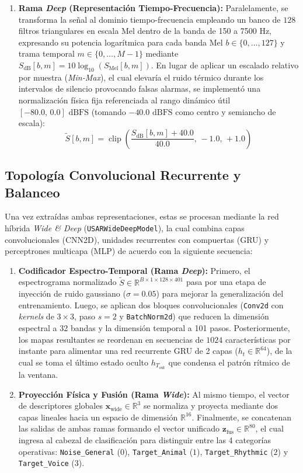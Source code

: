 \documentclass[journal, a4paper]{IEEEtran}
\begin{document}
\begin{enumerate}
    \item[2)] \textbf{Rama \textit{Deep} (Representación Tiempo-Frecuencia):} Paralelamente, se transforma la señal al dominio tiempo-frecuencia empleando un banco de $128$ filtros triangulares en escala Mel dentro de la banda de 150 a 7500 Hz, expresando su potencia logarítmica para cada banda Mel $b \in \{0, \dots, 127\}$ y trama temporal $m \in \{0, \dots, M-1\}$ mediante $S_{\text{dB}}[b, m] = 10\log_{10}(S_{\text{Mel}}[b, m])$. En lugar de aplicar un escalado relativo por muestra (\textit{Min-Max}), el cual elevaría el ruido térmico durante los intervalos de silencio provocando falsas alarmas, se implementó una normalización física fija referenciada al rango dinámico útil $[-80.0, \, 0.0]\text{ dBFS}$ (tomando $-40.0\text{ dBFS}$ como centro y semiancho de escala):
    \begin{equation}
        \tilde{S}[b, m] = \operatorname{clip}\left( \frac{S_{\text{dB}}[b, m] + 40.0}{40.0}, \, -1.0, \, +1.0 \right)
    \end{equation}
\end{enumerate}

\subsection{Topología Convolucional Recurrente y Balanceo}
Una vez extraídas ambas representaciones, estas se procesan mediante la red híbrida \textit{Wide \& Deep} (\texttt{USARWideDeepModel}), la cual combina capas convolucionales (CNN2D), unidades recurrentes con compuertas (GRU) y perceptrones multicapa (MLP) de acuerdo con la siguiente secuencia:

\begin{enumerate}
    \item[1)] \textbf{Codificador Espectro-Temporal (Rama \textit{Deep}):} Primero, el espectrograma normalizado $\tilde{S} \in \mathbb{R}^{B \times 1 \times 128 \times 401}$ pasa por una etapa de inyección de ruido gaussiano ($\sigma = 0.05$) para mejorar la generalización del entrenamiento. Luego, se aplican dos bloques convolucionales (\texttt{Conv2d} con \textit{kernels} de $3\times 3$, paso $s=2$ y \texttt{BatchNorm2d}) que reducen la dimensión espectral a 32 bandas y la dimensión temporal a 101 pasos. Posteriormente, los mapas resultantes se reordenan en secuencias de $1024$ características por instante para alimentar una red recurrente GRU de 2 capas ($h_t \in \mathbb{R}^{64}$), de la cual se toma el último estado oculto $h_{T_{\text{out}}}$ que condensa el patrón rítmico de la ventana.
    \item[2)] \textbf{Proyección Física y Fusión (Rama \textit{Wide}):} Al mismo tiempo, el vector de descriptores globales $\mathbf{x}_{\text{wide}} \in \mathbb{R}^3$ se normaliza y proyecta mediante dos capas lineales hacia un espacio de dimensión $\mathbb{R}^{16}$. Finalmente, se concatenan las salidas de ambas ramas formando el vector unificado $\mathbf{z}_{\text{fus}} \in \mathbb{R}^{80}$, el cual ingresa al cabezal de clasificación para distinguir entre las 4 categorías operativas: \texttt{Noise\_General} ($0$), \texttt{Target\_Animal} ($1$), \texttt{Target\_Rhythmic} ($2$) y \texttt{Target\_Voice} ($3$).
\end{enumerate}
\end{document}
